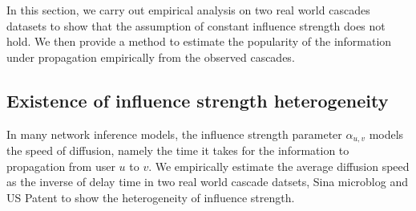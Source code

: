 \quad In this section, we carry out empirical analysis on two real world cascades datasets to show that the assumption of constant influence strength does not hold. We then provide a method to estimate the popularity of the information under propagation empirically from the observed cascades. 

\subsection{Existence of influence strength heterogeneity}
\quad In many network inference models, the influence strength parameter $\alpha_{u,v}$ models the speed of diffusion, namely the time it takes for the information to propagation from user $u$ to $v$.  We empirically estimate the average diffusion speed as the inverse of delay time in two real world cascade datsets, Sina microblog and US Patent to show the heterogeneity of influence strength. 

